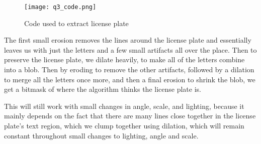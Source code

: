 \documentclass[12pt, letterpaper]{article}
\begin{document}
\begin{figure}[H]
    \centering
    \texttt{[image: q3\_code.png]}
    \caption{Code used to extract license plate}
\end{figure}

The first small erosion removes the lines around the license plate and essentially leaves us with just the letters and a few small artifacts all over the place. Then to preserve the license plate, we dilate heavily, to make all of the letters combine into a blob. Then by eroding to remove the other artifacts, followed by a dilation to merge all the letters once more, and then a final erosion to shrink the blob, we get a bitmask of where the algorithm thinks the license plate is.

This will still work with small changes in angle, scale, and lighting, because it mainly depends on the fact that there are many lines close together in the license plate's text region, which we clump together using dilation, which will remain constant throughout small changes to lighting, angle and scale.
\end{document}

